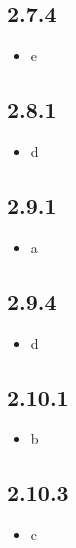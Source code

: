 \documentclass{article}
\begin{document}
\subsection*{2.7.4}
\begin{itemize}
    \item e
\end{itemize}

\subsection*{2.8.1}
\begin{itemize}
    \item d
\end{itemize}

\subsection*{2.9.1}
\begin{itemize}
    \item a
\end{itemize}

\subsection*{2.9.4}
\begin{itemize}
    \item d
\end{itemize}

\subsection*{2.10.1}
\begin{itemize}
    \item b
\end{itemize}

\subsection*{2.10.3}
\begin{itemize}
    \item c
\end{itemize}
\end{document}
